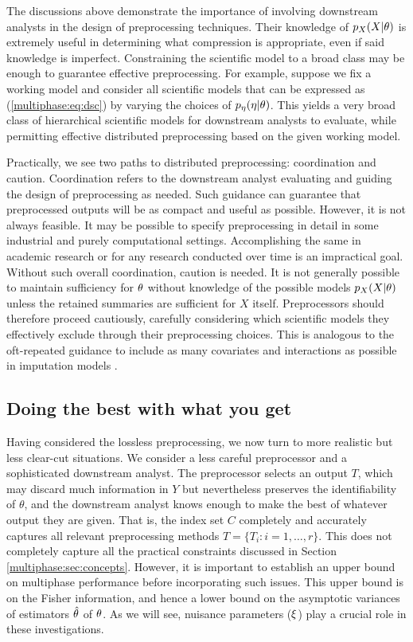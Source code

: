 The discussions above demonstrate   the importance of involving downstream analysts in the design of preprocessing techniques.
Their knowledge of $p_X(X | \theta)$ is extremely useful in determining what compression is appropriate, even if said knowledge is imperfect.
Constraining the scientific model to a broad class may be enough to guarantee effective preprocessing.
For example, suppose we fix a working model and consider all scientific models that can be expressed as (\ref{multiphase:eq:dsc}) by varying the choices of $p_\eta( \eta | \theta)$.
This yields a very broad class of hierarchical scientific models for downstream analysts to evaluate, while permitting effective distributed preprocessing based on the given working model.

Practically, we see two paths to distributed preprocessing: coordination and caution.
Coordination refers to the downstream analyst evaluating and guiding the design of preprocessing as needed.
Such guidance can guarantee that preprocessed outputs will be as compact and useful as possible.
However, it is not always feasible.
It may be possible to specify preprocessing in detail in some industrial and purely computational settings.
Accomplishing the same in academic research or for any research conducted over time is an impractical goal.
Without such overall coordination, caution is needed.
It is not generally possible to maintain sufficiency for $\theta$ without knowledge of the possible models $p_X(X | \theta)$ unless the retained summaries are sufficient for $X$ itself.
Preprocessors should therefore proceed cautiously, carefully considering which scientific models they effectively exclude through their preprocessing choices.
This is analogous to the oft-repeated guidance to include as many covariates and interactions as possible in imputation models \citep{Meng1994,Meng2003}.



\subsection{Doing the best with what you get}
\label{multiphase:sec:missinfo}

Having considered the lossless preprocessing, we now turn to more realistic but less clear-cut situations.
We consider a less careful preprocessor and a sophisticated downstream analyst.
The preprocessor selects an output $T$, which may discard much  information in $Y$ but nevertheless preserves the identifiability of $\theta$, and the downstream analyst knows enough to make the best of whatever output they are given.
That is, the  index set $C$ completely and accurately captures all relevant preprocessing methods $T=\{ T_i: i=1,\ldots, r \}$.
This does not completely capture all the practical constraints discussed in Section \ref{multiphase:sec:concepts}.
However, it is important to establish an upper bound on multiphase performance before incorporating such issues.
This upper bound is on the Fisher information, and hence a lower bound on the asymptotic variances of estimators $\hat{\theta}$ of $\theta$.
As we will see, nuisance parameters ($\xi$) play a crucial role in these investigations.

